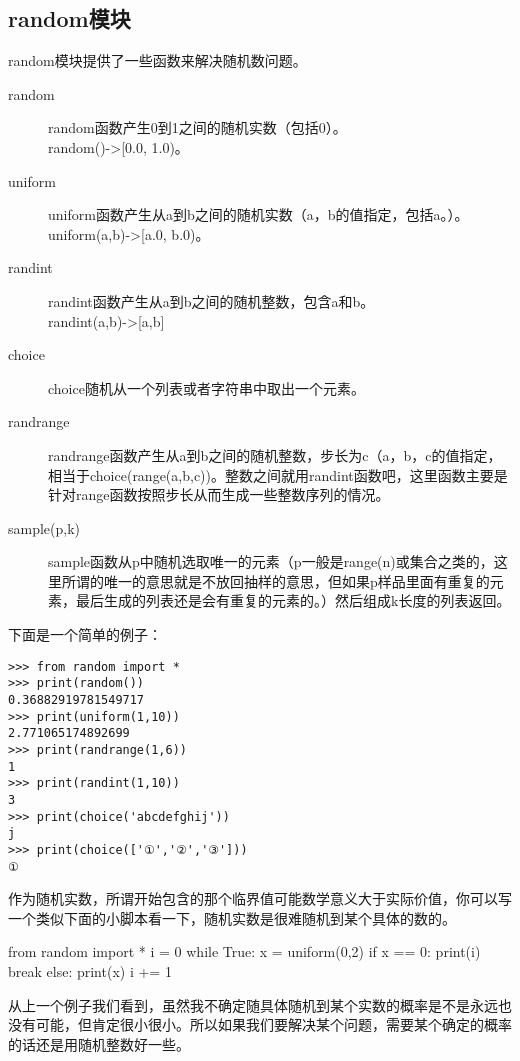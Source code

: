 \documentclass[12pt,oneside]{book}
\begin{document}
\begin{common-format}
\subsection{random模块}
random模块提供了一些函数来解决随机数问题。
\begin{description}
\item[random] random函数产生0到1之间的随机实数（包括0）。\\ random()->[0.0, 1.0)。
\item[uniform] uniform函数产生从a到b之间的随机实数（a，b的值指定，包括a。）。\\ uniform(a,b)->[a.0, b.0)。
\item[randint] randint函数产生从a到b之间的随机整数，包含a和b。\\ randint(a,b)->[a,b]
\item[choice] choice随机从一个列表或者字符串中取出一个元素。
\item[randrange] randrange函数产生从a到b之间的随机整数，步长为c（a，b，c的值指定，相当于choice(range(a,b,c))。整数之间就用randint函数吧，这里函数主要是针对range函数按照步长从而生成一些整数序列的情况。
\item[sample(p,k)] sample函数从p中随机选取唯一的元素（p一般是range(n)或集合之类的，这里所谓的唯一的意思就是不放回抽样的意思，但如果p样品里面有重复的元素，最后生成的列表还是会有重复的元素的。）然后组成k长度的列表返回。
\end{description}

下面是一个简单的例子：
\begin{Verbatim}
>>> from random import *
>>> print(random())
0.36882919781549717
>>> print(uniform(1,10))
2.771065174892699
>>> print(randrange(1,6))
1
>>> print(randint(1,10))
3
>>> print(choice('abcdefghij'))
j
>>> print(choice(['①','②','③']))
①
\end{Verbatim}



作为随机实数，所谓开始包含的那个临界值可能数学意义大于实际价值，你可以写一个类似下面的小脚本看一下，随机实数是很难随机到某个具体的数的。
\begin{tcbpython}[]
from random import *
i = 0
while True:
    x = uniform(0,2)
    if x == 0:
        print(i)
        break
    else:
        print(x)
        i += 1
\end{tcbpython}

从上一个例子我们看到，虽然我不确定随具体随机到某个实数的概率是不是永远也没有可能，但肯定很小很小。所以如果我们要解决某个问题，需要某个确定的概率的话还是用随机整数好一些。



\end{common-format}
\end{document}

